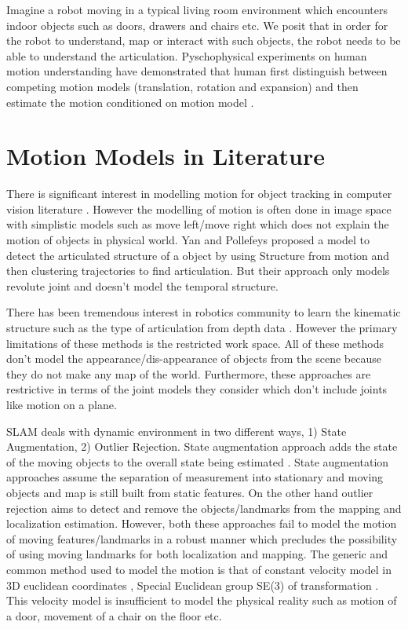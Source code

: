 \documentclass[10pt,twocolumn,letterpaper]{article}
\begin{document}
Imagine a robot moving in a typical living room environment which encounters indoor objects such as doors, drawers and chairs etc. We posit that in order for the robot to understand, map or interact with such objects, the robot needs to be able to understand the articulation. Pyschophysical experiments on human motion understanding have demonstrated that human first distinguish between competing motion models (translation, rotation and expansion) and then estimate the motion conditioned on motion model \cite{NIPS2008_3458}. 

\section{Motion Models in Literature}
There is significant interest in modelling motion for object tracking in computer vision literature \cite{cifuentes2012motion}. However the modelling of motion is often done in image space with simplistic models such as move left/move right which does not explain the motion of objects in physical world. Yan and Pollefeys \cite{yan2006automatic} proposed a model to detect the articulated structure of a object by using Structure from motion and then clustering trajectories to find articulation. But their approach only models revolute joint and doesn't model the temporal structure. 

There has been tremendous interest in robotics community to learn the kinematic structure such as the type of articulation from depth data \cite{sturm2010vision,katz2013interactive,katz2014interactive}. However the primary limitations of these methods is the restricted work space. All of these methods don't model the appearance/dis-appearance of objects from the scene because they do not make any map of the world. Furthermore, these approaches are restrictive in terms of the joint models they consider which don't include joints like motion on a plane.

SLAM deals with dynamic environment in two different ways, 1) State Augmentation, 2) Outlier Rejection. State augmentation approach adds the state of the moving objects to the overall state being estimated \cite{wang2003online}. State augmentation approaches \cite{wang2003online,kundu2011realtime} assume the separation of measurement into stationary and moving objects and map is still built from static features.  On the other hand outlier rejection aims to detect and remove the objects/landmarks from the mapping and localization estimation. However, both these approaches fail to model the motion of moving features/landmarks in a robust manner which precludes the possibility of using moving landmarks for both localization and mapping.  The generic and common method used to model the motion is that of constant velocity model in 3D euclidean coordinates \cite{wang2003online}, Special Euclidean group SE(3) of transformation \cite{kundu2011realtime}. This velocity model is insufficient to model the physical reality such as motion of a door, movement of a chair on the floor etc.
\end{document}
